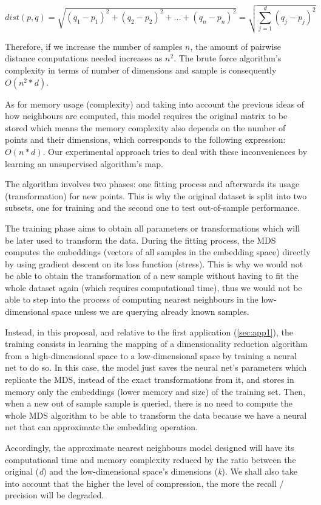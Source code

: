 \documentclass[a4paper,11pt,spanish]{report}
\begin{document}
$$ dist(p,q) = \sqrt{(q_{1}-p_{1})^{2}+(q_{2}-p_{2})^{2}+ ... + (q_{n}-p_{n})^{2}} = \sqrt{\sum_{j=1}^{d} (q_{j}-p_{j})^{2}}$$

Therefore, if we increase the number of samples $n$, the amount of pairwise distance computations needed increases as $n^{2}$. The brute force algorithm's complexity in terms of number of dimensions and sample is consequently $O(n^{2}*d)$.

As for memory usage (complexity) and taking into account the previous ideas of how neighbours are computed, this model requires the original matrix to be stored which means the memory complexity also depends on the number of points and their dimensions, which corresponds to the following expression: $O(n*d)$. Our experimental approach tries to deal with these inconveniences by learning an unsupervised algorithm's map.

The algorithm involves two phases: one fitting process and afterwards its usage (transformation) for new points. This is why the original dataset is split into two subsets, one for training and the second one to test out-of-sample performance.

The training phase aims to obtain all parameters or transformations which will be later used to transform the data. During the fitting process, the MDS computes the embeddings (vectors of all samples in the embedding space) directly by using gradient descent on its loss function (stress). This is why we would not be able to obtain the transformation of a new sample without having to fit the whole dataset again (which requires computational time), thus we would not be able to step into the process of computing nearest neighbours in the low-dimensional space unless we are querying already known samples.

Instead, in this proposal, and relative to the first application (\ref{sec:app1}), the training consists in learning the mapping of a dimensionality reduction algorithm from a high-dimensional space to a low-dimensional space by training a neural net to do so. In this case, the model just saves the neural net's parameters which replicate the MDS, instead of the exact transformations from it, and stores in memory only the embeddings (lower memory and size) of the training set. Then, when a new out of sample sample is queried, there is no need to compute the whole MDS algorithm to be able to transform the data because we have a neural net that can approximate the embedding operation.

Accordingly, the approximate nearest neighbours model designed will have its computational time and memory complexity reduced by the ratio between the original (\textit{d}) and the low-dimensional space's dimensions (\textit{k}). We shall also take into account that the higher the level of compression, the more the recall / precision will be degraded.
\end{document}
